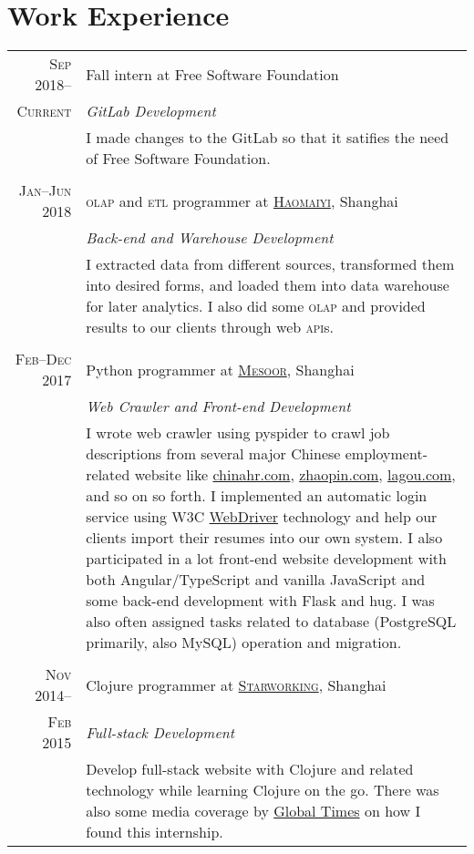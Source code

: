 \documentclass[a4paper,11pt]{article}
\begin{document}
\section{Work Experience}
\begin{tabularx}{.935\textwidth}{r|X}
  \textsc{Sep 2018--}    & Fall intern at Free Software Foundation \\
  \textsc{Current}       & \emph{GitLab Development} \\
                         & \footnotesize I made changes to the GitLab so that it satifies the need of Free Software Foundation.\\
  \multicolumn{2}{c}{} \\
  \textsc{Jan--Jun 2018} & \textsc{olap} and \textsc{etl} programmer at \href{https://www.haomaiyi.com/}{\textsc{Haomaiyi}}, Shanghai \\
                         & \emph{Back-end and Warehouse Development} \\
                         & \footnotesize I extracted data from different sources, transformed them into desired forms, and loaded them into data warehouse for later analytics.  I also did some \textsc{olap} and provided results to our clients through web \textsc{api}s.\\
  \multicolumn{2}{c}{} \\
  \textsc{Feb--Dec 2017} & Python programmer at \href{https://www.mesoor.com/}{\textsc{Mesoor}}, Shanghai \\
                         & \emph{Web Crawler and Front-end Development}\\
                         & \footnotesize I wrote web crawler using pyspider to crawl job descriptions from several major Chinese employment-related website like \href{http://www.chinahr.com/}{chinahr.com}, \href{https://www.zhaopin.com/}{zhaopin.com}, \href{https://www.lagou.com/}{lagou.com}, and so on so forth.  I implemented an automatic login service using W3C \href{https://github.com/w3c/web-platform-tests/pull/6743}{WebDriver} technology and help our clients import their resumes into our own system.  I also participated in a lot front-end website development with both Angular/TypeScript and vanilla JavaScript and some back-end development with Flask and hug.  I was also often assigned tasks related to database (PostgreSQL primarily, also MySQL) operation and migration.\\
  \multicolumn{2}{c}{} \\
  \textsc{Nov 2014--}    & Clojure programmer at \href{http://www.starworking.com/}{\textsc{Starworking}}, Shanghai \\
  \textsc{Feb 2015}      & \emph{Full-stack Development}\\
                         & \footnotesize Develop full-stack website with Clojure and related technology while learning Clojure on the go.  There was also some media coverage by \href{http://www.globaltimes.cn/content/871111.shtml}{Global Times} on how I found this internship.
\end{tabularx}
\end{document}
